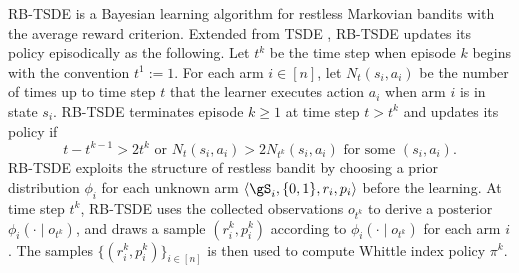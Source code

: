 RB-TSDE is a Bayesian learning algorithm for restless Markovian bandits with the average reward criterion.
Extended from TSDE \cite{ouyang2017learning}, RB-TSDE updates its policy episodically as the following.
Let $t^k$ be the time step when episode $k$ begins with the convention $t^1:=1$.
For each arm $i\in[n]$, let $N_t(s_i,a_i)$ be the number of times up to time step $t$ that the learner executes action $a_i$ when arm $i$ is in state $s_i$.
RB-TSDE terminates episode $k\ge1$ at time step $t> t^k$ and updates its policy if
\begin{equation}
    \label{ch:restless:eq:update_crit}
    t-t^{k-1}>2t^k \text{ or } N_t(s_i,a_i) > 2N_{t^k}(s_i,a_i) \text{ for some }(s_i,a_i).
\end{equation}
RB-TSDE \cite{akbarzadeh2022learning} exploits the structure of restless bandit by choosing a prior distribution $\phi_i$ for each unknown arm $\langle\gS_i, \{0,1\}, r_i, p_i\rangle$ before the learning.
At time step $t^k$, RB-TSDE uses the collected observations $o_{t^k}$ to derive a posterior $\phi_i(\cdot\mid o_{t^k})$, and draws a sample $(r^k_i,p^k_i)$ according to $\phi_i(\cdot\mid o_{t^k})$ for each arm $i$.
The samples $\{(r^k_i,p^k_i)\}_{i\in[n]}$ is then used to compute Whittle index policy $\pi^k$.

